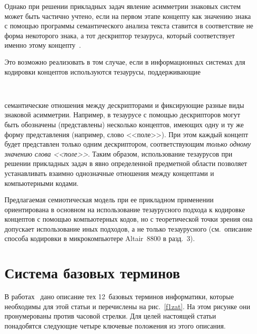 \begin{multicols}{2}
   Однако при решении прикладных задач явление асимметрии знаковых систем может 
быть частично учтено, если на первом этапе концепту как значению знака с помощью 
программы семантического анализа текста ставится в соответствие не форма некоторого 
знака, а тот дескриптор тезауруса, который соответствует именно этому 
концепту~\cite{22zat}.
   
   Это возможно реализовать в том случае, если в информационных системах для кодировки 
концептов используются тезаурусы, поддерживающие 
\begin{figure*}[b] %
\vspace*{1pt}
\begin{center}
\vspace*{1pt}
\mbox{%
\epsfxsize=150.154mm
}
\end{center}
\vspace*{-9pt}
\end{figure*}
семантические отношения между 
дескрипторами и фиксирующие разные виды знаковой асимметрии. Например, в тезаурусе с 
помощью дескрипторов могут быть обозначены (представлены) несколько концептов, 
имеющих одну и ту же форму пред\-став\-ле\-ния (например, слово <<поле>>). При этом каждый 
концепт будет представлен только одним дескриптором, соответствующим \textit{только 
одному значению слова <<поле>>}. Таким образом, использование тезаурусов при решении 
прикладных задач в явно определенной предметной области позволяет устанавливать 
взаимно однозначные отношения между концептами и компьютерными кодами.
   
   Предлагаемая семиотическая модель при ее прикладном применении ориентирована в 
основном на использование тезаурусного подхода к кодировке концептов с помощью 
компьютерных кодов, но с теоретической точки зрения она допускает использование иных 
подходов, а не только тезаурусного (см.\ описание способа кодировки в микрокомпьютере 
Altair~8800 в разд.~3).

\section{Система базовых терминов}
   
   В работах~\cite{8zat, 9zat} дано описание тех 12~базовых терминов информатики, 
которые необходимы для этой статьи и перечислены на рис.~\ref{f1zat}. На этом рисунке они 
пронумерованы против часовой стрелки. Для целей настоящей статьи понадобятся 
сле\-ду\-ющие четыре ключевые положения из этого описания.
   

\end{multicols}

